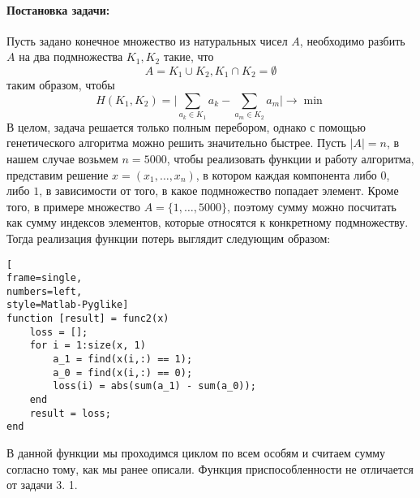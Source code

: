 \documentclass[12pt]{article}
\begin{document}
\paragraph{Постановка задачи:} Пусть задано конечное множество из натуральных чисел $A$, необходимо разбить $A$ на два подмножества $K_1, K_2$ такие, что
$$
A = K_1 \cup K_2, K_1 \cap K_2 = \emptyset
$$
таким образом, чтобы 
$$
H(K_1, K_2) = \Bigg|\sum_{a_k \in K_1} a_k - \sum_{a_m \in K_2} a_m\Bigg| \to \min
$$
В целом, задача решается только полным перебором, однако с помощью генетического алгоритма можно решить значительно быстрее. Пусть $|A| = n$, в нашем случае возьмем $n = 5000$, чтобы реализовать функции и работу алгоритма, представим решение $x = (x_1, \dots, x_n)$, в котором каждая компонента либо $0$, либо $1$, в зависимости от того, в какое подмножество попадает элемент. Кроме того, в примере множество $A = \{1, \dots, 5000\}$, поэтому сумму можно посчитать как сумму индексов элементов, которые относятся к конкретному подмножеству.
Тогда реализация функции потерь выглядит следующим образом:
\begin{lstlisting}[
frame=single,
numbers=left,
style=Matlab-Pyglike]
function [result] = func2(x)
    loss = [];
    for i = 1:size(x, 1)
        a_1 = find(x(i,:) == 1);
        a_0 = find(x(i,:) == 0);
        loss(i) = abs(sum(a_1) - sum(a_0));
    end
    result = loss;
end
\end{lstlisting}
В данной функции мы проходимся циклом по всем особям и считаем сумму согласно тому, как мы ранее описали. Функция приспособленности не отличается от задачи 3. 1.
\end{document}
